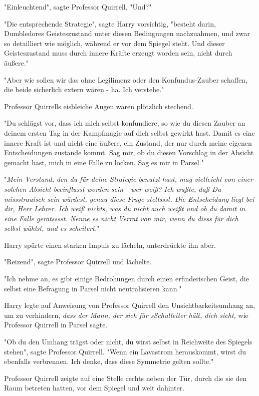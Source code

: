 {"Einleuchtend", sagte Professor Quirrell. "Und?"

"Die entsprechende Strategie", sagte Harry vorsichtig, "besteht darin, Dumbledores Geisteszustand unter diesen Bedingungen nachzuahmen, und zwar so detailliert wie möglich, während er vor dem Spiegel steht. Und dieser Geisteszustand muss durch innere Kräfte erzeugt worden sein, nicht durch äußere."

"Aber wie sollen wir das ohne Legilimenz oder den Konfundus-Zauber schaffen, die beide sicherlich extern wären - ha. Ich verstehe."

Professor Quirrells eisbleiche Augen waren plötzlich stechend.

"Du schlägst vor, dass ich mich selbst konfundiere, so wie du diesen Zauber an deinem ersten Tag in der Kampfmagie auf dich selbst gewirkt hast. Damit es eine innere Kraft ist und nicht eine äußere, ein Zustand, der nur durch meine eigenen Entscheidungen zustande kommt. Sag mir, ob du diesen Vorschlag in der Absicht gemacht hast, mich in eine Falle zu locken. Sag es mir in Parsel."

"\emph{Mein Verstand, den du für deine Strategie benutzt hast, mag vielleicht von einer solchen Absicht beeinflusst worden sein - wer weiß? Ich wußte, daß Du missstrauisch sein würdest, genau diese Frage stellssst. Die Entscheidung liegt bei dir, Herr Lehrer. Ich weiß nichts, was du nicht auch weißt und ob du damit in eine Falle gerätsssst. Nenne es nicht Verrat von mir, wenn du diess für dich selbst wählst, und es scheitert.}"

Harry spürte einen starken Impuls zu lächeln, unterdrückte ihn aber.

"Reizend", sagte Professor Quirrell und lächelte.

"Ich nehme an, es gibt einige Bedrohungen durch einen erfinderischen Geist, die selbst eine Befragung in Parsel nicht neutralisieren kann."

Harry legte auf Anweisung von Professor Quirrell den Unsichtbarkeitsumhang an, um zu verhindern, \emph{dass der Mann, der sich für sSchulleiter hält, dich sieht,} wie Professor Quirrell in Parsel sagte.

"Ob du den Umhang trägst oder nicht, du wirst selbst in Reichweite des Spiegels stehen", sagte Professor Quirrell. "Wenn ein Lavastrom herauskommt, wirst du ebenfalls verbrennen. Ich denke, dass diese Symmetrie gelten sollte."

Professor Quirrell zeigte auf eine Stelle rechts neben der Tür, durch die sie den Raum betreten hatten, vor dem Spiegel und weit dahinter.

}
